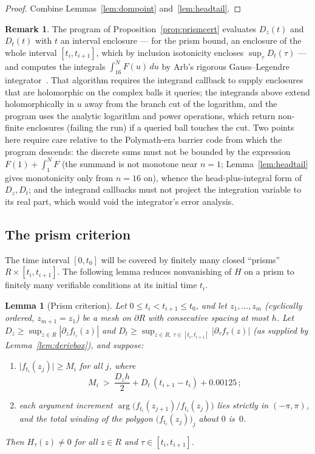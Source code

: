 \documentclass[11pt]{article}
\newtheorem{lemma}[theorem]{Lemma}
\theoremstyle{definition}
\newtheorem{remark}[theorem]{Remark}
\begin{document}
\begin{proof}
Combine Lemmas~\ref{lem:dompoint} and~\ref{lem:headtail}.
\end{proof}

\begin{remark}\label{rem:quadrature}
The program of Proposition~\ref{prop:prismcert} evaluates $D_z(t)$
and $D_t(t)$ with $t$ an
interval enclosure --- for the prism bound, an enclosure of the
whole interval $[t_i,t_{i+1}]$, which by inclusion isotonicity
encloses $\sup_\tau D_t(\tau)$ --- and computes the integrals
$\int_{16}^NF(u)\,du$ by Arb's rigorous Gauss--Legendre
integrator~\cite{JohanssonIntegration}. That algorithm requires the
integrand callback to supply enclosures that are holomorphic on the
complex balls it queries; the integrands above extend
holomorphically in $u$ away from the branch cut of the logarithm,
and the program uses the analytic logarithm and power operations,
which return non-finite enclosures (failing the run) if a queried
ball touches the cut. Two points here require care relative to the
Polymath-era barrier code from which the program descends: the
discrete sums must not be bounded by the expression
$F(1)+\int_1^NF$ (the summand
is not monotone near $n=1$; Lemma~\ref{lem:headtail} gives
monotonicity only from $n=16$ on), whence the head-plus-integral
form of $D_z,D_t$; and the integrand callbacks must not project
the integration variable to its real part, which would void
the integrator's error analysis.
\end{remark}

\subsection{The prism criterion}\label{sec:prism}

The time interval $[0,t_0]$ will be covered by finitely many closed
``prisms'' $R\times[t_i,t_{i+1}]$. The following lemma reduces
nonvanishing of $H$ on a prism to finitely many verifiable
conditions at its initial time $t_i$.

\begin{lemma}[Prism criterion]\label{lem:prism}
Let $0\le t_i<t_{i+1}\le t_0$, and let $z_1,\dots,z_m$
(cyclically ordered, $z_{m+1}=z_1$) be a mesh on $\partial R$ with
consecutive spacing at most $h$. Let $D_z\ge\sup_{z\in R}|\partial_zf_{t_i}(z)|$ and
$D_t\ge\sup_{z\in R,\ \tau\in[t_i,t_{i+1}]}
|\partial_\tau f_\tau(z)|$ (as supplied by
Lemma~\ref{lem:derivbox}), and suppose:
\begin{enumerate}
\item[\textup{(a)}] $\bigl|f_{t_i}(z_j)\bigr|\ge M_i$ for all $j$,
where
\begin{equation}\label{eq:gate}
M_i\ >\ \frac{D_{z}h}{2}
+D_{t}\,(t_{i+1}-t_i)+0.00125\,;
\end{equation}
\item[\textup{(b)}] each argument increment
$\arg\bigl(f_{t_i}(z_{j+1})/f_{t_i}(z_j)\bigr)$ lies strictly in
$(-\pi,\pi)$, and the total winding of the polygon
$\bigl(f_{t_i}(z_j)\bigr)_j$ about $0$ is~$0$.
\end{enumerate}
Then $H_\tau(z)\neq0$ for all $z\in R$ and
$\tau\in[t_i,t_{i+1}]$.
\end{lemma}
\end{document}
